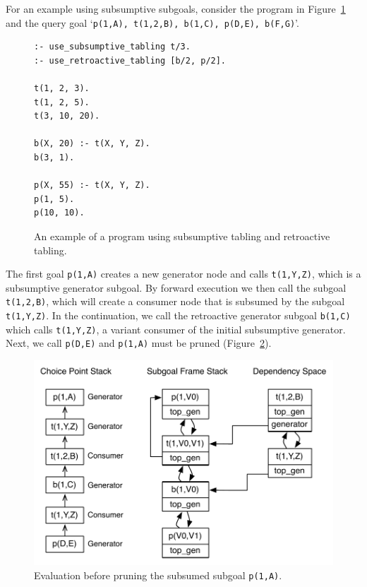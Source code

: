 For an example using subsumptive subgoals, consider the program in Figure~\ref{fig:retro_sub} and
the query goal `\texttt{p(1,A),~t(1,2,B),~b(1,C),~p(D,E),~b(F,G)}'.

\begin{figure}[ht]
\begin{Verbatim}
:- use_subsumptive_tabling t/3.
:- use_retroactive_tabling [b/2, p/2].

t(1, 2, 3).
t(1, 2, 5).
t(3, 10, 20).

b(X, 20) :- t(X, Y, Z).
b(3, 1).

p(X, 55) :- t(X, Y, Z).
p(1, 5).
p(10, 10).
\end{Verbatim}
\caption{An example of a program using subsumptive tabling and retroactive tabling.}
\label{fig:retro_sub}
\end{figure}

The first goal \texttt{p(1,A)} creates a new generator node and calls \texttt{t(1,Y,Z)}, which is
a subsumptive generator subgoal. By forward execution we then call the subgoal \texttt{t(1,2,B)}, which will create
a consumer node that is subsumed by the subgoal \texttt{t(1,Y,Z)}. In the continuation, we call the retroactive generator
subgoal \texttt{b(1,C)} which calls \texttt{t(1,Y,Z)}, a variant consumer of the initial subsumptive generator.
Next, we call \texttt{p(D,E)} and \texttt{p(1,A)} must be pruned (Figure~\ref{fig:retro_sub1}).

\begin{figure}[ht]
  \centering
    \includegraphics[scale=0.5]{retro_sub1.pdf}
  \caption{Evaluation before pruning the subsumed subgoal \texttt{p(1,A)}.}
  \label{fig:retro_sub1}
\end{figure}

